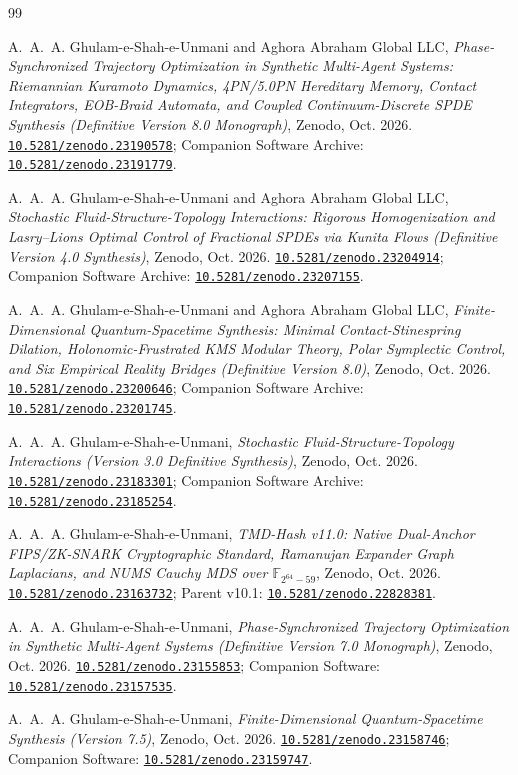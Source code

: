 \documentclass[11pt,a4paper,reqno]{article}
\newcommand{\zenodo}[1]{\href{https://doi.org/10.5281/zenodo.#1}{\texttt{10.5281/zenodo.#1}}}
\theoremstyle{plain}
\theoremstyle{definition}
\theoremstyle{remark}
\numberwithin{equation}{section}
\begin{document}
\begin{thebibliography}{99}

A.~A.~A. Ghulam-e-Shah-e-Unmani and {Aghora Abraham Global LLC}, \emph{Phase-Synchronized Trajectory Optimization in Synthetic Multi-Agent Systems: Riemannian Kuramoto Dynamics, 4PN/5.0PN Hereditary Memory, Contact Integrators, EOB-Braid Automata, and Coupled Continuum-Discrete SPDE Synthesis (Definitive Version 8.0 Monograph)}, Zenodo, Oct. 2026. \zenodo{23190578}; Companion Software Archive: \zenodo{23191779}.

A.~A.~A. Ghulam-e-Shah-e-Unmani and {Aghora Abraham Global LLC}, \emph{Stochastic Fluid-Structure-Topology Interactions: Rigorous Homogenization and Lasry--Lions Optimal Control of Fractional SPDEs via Kunita Flows (Definitive Version 4.0 Synthesis)}, Zenodo, Oct. 2026. \zenodo{23204914}; Companion Software Archive: \zenodo{23207155}.

A.~A.~A. Ghulam-e-Shah-e-Unmani and {Aghora Abraham Global LLC}, \emph{Finite-Dimensional Quantum-Spacetime Synthesis: Minimal Contact-Stinespring Dilation, Holonomic-Frustrated KMS Modular Theory, Polar Symplectic Control, and Six Empirical Reality Bridges (Definitive Version 8.0)}, Zenodo, Oct. 2026. \zenodo{23200646}; Companion Software Archive: \zenodo{23201745}.

A.~A.~A. Ghulam-e-Shah-e-Unmani, \emph{Stochastic Fluid-Structure-Topology Interactions (Version 3.0 Definitive Synthesis)}, Zenodo, Oct. 2026. \zenodo{23183301}; Companion Software Archive: \zenodo{23185254}.

A.~A.~A. Ghulam-e-Shah-e-Unmani, \emph{TMD-Hash v11.0: Native Dual-Anchor FIPS/ZK-SNARK Cryptographic Standard, Ramanujan Expander Graph Laplacians, and NUMS Cauchy MDS over $\mathbb{F}_{2^{64}-59}$}, Zenodo, Oct. 2026. \zenodo{23163732}; Parent v10.1: \zenodo{22828381}.

A.~A.~A. Ghulam-e-Shah-e-Unmani, \emph{Phase-Synchronized Trajectory Optimization in Synthetic Multi-Agent Systems (Definitive Version 7.0 Monograph)}, Zenodo, Oct. 2026. \zenodo{23155853}; Companion Software: \zenodo{23157535}.

A.~A.~A. Ghulam-e-Shah-e-Unmani, \emph{Finite-Dimensional Quantum-Spacetime Synthesis (Version 7.5)}, Zenodo, Oct. 2026. \zenodo{23158746}; Companion Software: \zenodo{23159747}.


\end{thebibliography}
\end{document}
